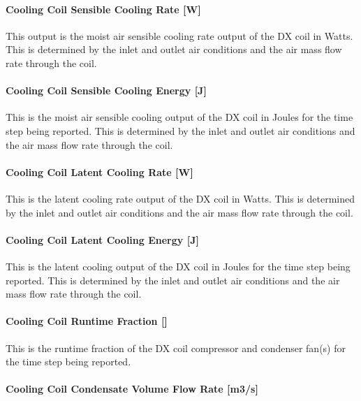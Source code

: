 \paragraph{Cooling Coil Sensible Cooling Rate {[}W{]}}\label{cooling-coil-sensible-cooling-rate-w-1}

This output is the moist air sensible cooling rate output of the DX coil in Watts. This is determined by the inlet and outlet air conditions and the air mass flow rate through the coil.

\paragraph{Cooling Coil Sensible Cooling Energy {[}J{]}}\label{cooling-coil-sensible-cooling-energy-j-1}

This is the moist air sensible cooling output of the DX coil in Joules for the time step being reported. This is determined by the inlet and outlet air conditions and the air mass flow rate through the coil.

\paragraph{Cooling Coil Latent Cooling Rate {[}W{]}}\label{cooling-coil-latent-cooling-rate-w}

This is the latent cooling rate output of the DX coil in Watts. This is determined by the inlet and outlet air conditions and the air mass flow rate through the coil.

\paragraph{Cooling Coil Latent Cooling Energy {[}J{]}}\label{cooling-coil-latent-cooling-energy-j}

This is the latent cooling output of the DX coil in Joules for the time step being reported. This is determined by the inlet and outlet air conditions and the air mass flow rate through the coil.

\paragraph{Cooling Coil Runtime Fraction {[]}}\label{cooling-coil-runtime-fraction}

This is the runtime fraction of the DX coil compressor and condenser fan(s) for the time step being reported.

\paragraph{Cooling Coil Condensate Volume Flow Rate {[}m3/s{]}}\label{cooling-coil-condensate-volume-flow-rate-m3s-1}

